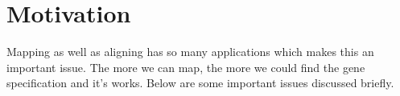 \documentclass{standalone}
\begin{document}
\section{Motivation}
Mapping as well as aligning has so many applications which makes this an important issue. The more we can map, the more we could find the gene specification and it's works. Below are some important issues discussed briefly.
\end{document}
